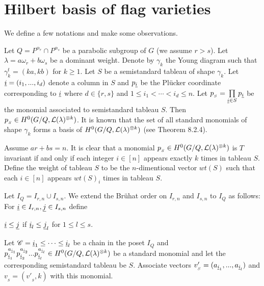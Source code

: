 %
    \section{Hilbert basis of flag varieties}
    \label{sec:fv_notations}
    We define a few notations and make some observations.

   Let \(Q = P^{\alpha_r}\cap P^{\alpha_s}\) be a parabolic subgroup of  \(G\) (we assume \(r>s\)). Let \(\lambda = a \omega_r + b \omega_s \) be a dominant weight.  Denote by \(\gamma_k\)  the Young diagram such that \(\gamma_k^t = (ka,kb)\) for \(k\ge1\). Let \(S\) be a semistandard tableau of shape \(\gamma_k\). 
Let \(\underline{i} = (i_1,...,i_d)\) denote a column in \(S\) and \(p_{\underline{i}}\) be the Pl\"{u}cker coordinate corresponding to \(\underline{i}\) where \(d \in \{r,s\}\) and \(1 \le i_1 < \cdots < i_d \le n\). Let \(p_{_S} = \prod\limits_{\underline{i}\in S} p_{\underline{i}}\) be the monomial associated to semistandard tableau \(S\). Then \(p_{_S} \in H^0(G/Q,{\cal L}(\lambda)^{\otimes k})\). It is known that the set of all standard monomials of shape \(\gamma_k\) forms a basis of  \(H^0(G/Q,{\cal L}(\lambda)^{\otimes k})\) (see \cite{lakshmibai2015grassbook} Theorem 8.2.4). 
    
    Assume \(ar + bs = n\). It is clear that a monomial \(p_{_S} \in H^0(G/Q,{\cal L}(\lambda)^{\otimes k})\) is \(T\) invariant if and only if each integer \(i \in [n]\) appears exactly \(k\) times in tableau \(S\). Define the weight of tableau \(S\) to be the \(n\)-dimentional vector \(wt(S)\) such that each \(i\in [n]\) appears \(wt(S)_i\) times in tableau \(S\).

    Let $I_{Q} = I_{r,n} \cup I_{s,n}$. We extend the Br\"{u}hat order on \(I_{r,n}\) and \(I_{s,n}\) to \(I_{Q}\) as follows: For \(\underline{i} \in I_{r,n}, \underline{j} \in I_{s,n}\) define 
\begin{center}
\(\underline{i} \le \underline{j}\) if \(\underline{i}_l \le \underline{j}_l\) for \(1 \le l \le s\).
\end{center}
    
    Let \(\mathscr{C} = {\underline{i}_1} \le \cdots \le  {\underline{i}_l}\) be a chain in the poset $I_Q$ and \(p_{\underline{i}_1}^{a_{\underline{i}_1}}p_{\underline{i}_2}^{a_{\underline{i}_2}}...p_{\underline{i}_l}^{a_{\underline{i}_l}} \in H^0(G/Q, {\cal L}(\lambda)^{\otimes k})\) be a standard monomial and let the corresponding semistandard tableau be \(S\). Associate vectors \(v'_{_S} = (a_{\underline{i}_1},...,a_{\underline{i}_l})\) and \(v_{_S} = (v'_{_S},k)\) with this monomial.
    
